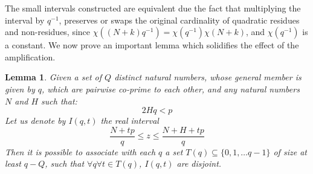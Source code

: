 \documentclass{report}
\newtheorem{lemma}{Lemma}
\begin{document}
The small intervals constructed are equivalent due the fact that multiplying the interval by $q^{-1}$, preserves or swaps the original cardinality of quadratic residues and non-residues, since $\chi((N+k)q^{-1})=\chi(q^{-1})\chi(N+k)$, and $\chi(q^{-1})$ is a constant. We now prove an important lemma which solidifies the effect of the amplification.
%
\begin{lemma}
\cite{burgess}Given a set of $Q$ distinct natural numbers, whose general member is given by $q$, which are pairwise co-prime to each other, and any natural numbers $N$ and $H$ such that:
\begin{equation} \label{lemma3cond}
2Hq<p
\end{equation}
Let us denote by $I(q,t)$ the real interval
$$\frac{N+tp}{q} \leq z \leq \frac{N+H+tp}{q}$$
Then it is possible to associate with each $q$ a set $T(q)\subseteq \{0,1,\ldots q-1\}$ of size at least $q-Q$, such that $\forall q \forall t\in T(q)$, $I(q,t)$ are disjoint.
\end{lemma}
\end{document}
